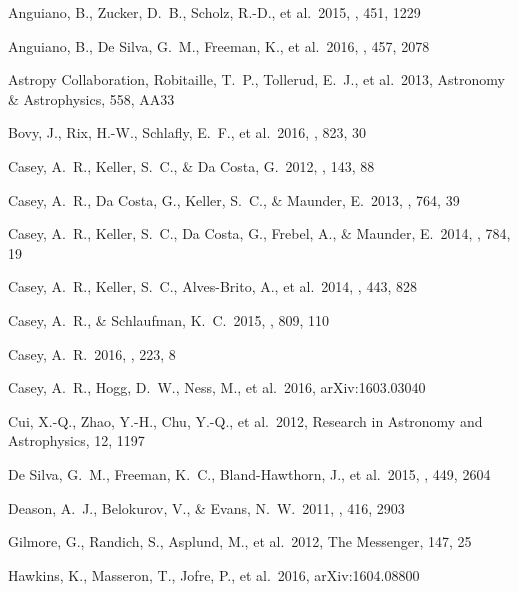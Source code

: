 \documentclass[preprint,trackchanges]{aastex}
\begin{document}
\begin{thebibliography}{dummy}
 Anguiano, B., Zucker, D.~B., Scholz, R.-D., et al.\ 2015, \mnras, 451, 1229 

 Anguiano, B., De Silva, G.~M., Freeman, K., et al.\ 2016, \mnras, 457, 2078 

 Astropy Collaboration, Robitaille, T.~P., Tollerud, E.~J., et al.\ 2013, Astronomy \& Astrophysics, 558, AA33

 Bovy, J., Rix, H.-W., Schlafly, E.~F., et al.\ 2016, \apj, 823, 30 

 Casey, A.~R., Keller, S.~C., \& Da Costa, G.\ 2012, \aj, 143, 88 

 Casey, A.~R., Da Costa, G., Keller, S.~C., \& Maunder, E.\ 2013, \apj, 764, 39 

 Casey, A.~R., Keller, S.~C., Da Costa, G., Frebel, A., \& Maunder, E.\ 2014, \apj, 784, 19 

 Casey, A.~R., Keller, S.~C., Alves-Brito, A., et al.\ 2014, \mnras, 443, 828 

 Casey, A.~R., \& Schlaufman, K.~C.\ 2015, \apj, 809, 110 

 Casey, A.~R.\ 2016, \apjs, 223, 8 

 Casey, A.~R., Hogg, D.~W., Ness, M., et al.\ 2016, arXiv:1603.03040 

 Cui, X.-Q., Zhao, Y.-H., Chu, Y.-Q., et al.\ 2012, Research in Astronomy and Astrophysics, 12, 1197 

 De Silva, G.~M., Freeman, K.~C., Bland-Hawthorn, J., et al.\ 2015, \mnras, 449, 2604 

 Deason, A.~J., Belokurov, V., \& Evans, N.~W.\ 2011, \mnras, 416, 2903 

 Gilmore, G., Randich, S., Asplund, M., et al.\ 2012, The Messenger, 147, 25

 Hawkins, K., Masseron, T., Jofre, P., et al.\ 2016, arXiv:1604.08800 


\end{thebibliography}
\end{document}

